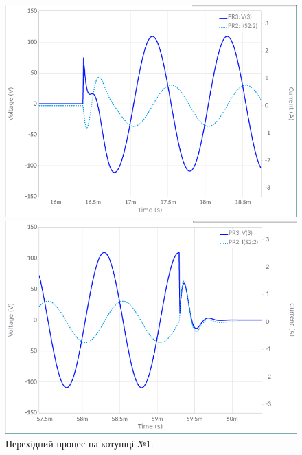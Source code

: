 \documentclass{article}
\begin{document}
\begin{normalsize}
	\begin{figure}[H]
		\begin{minipage}[t]{0.45\textwidth}
			\centering
			\includegraphics[width=\textwidth]{21}
		\end{minipage}
		\hfill
		\begin{minipage}[t]{0.45\textwidth}
			\centering
			\includegraphics[width=\textwidth]{22}
		\end{minipage}
		\caption{Перехідний процес на котушці №1.}
	\end{figure}


\end{normalsize}
\end{document}
